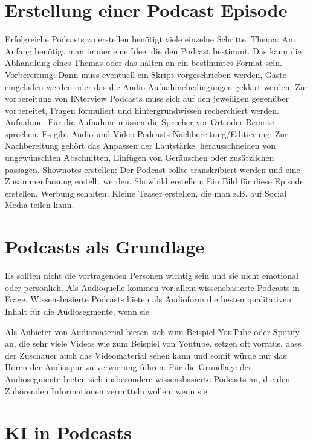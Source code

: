 \section{Erstellung einer Podcast Episode}

Erfolgreiche Podcasts zu erstellen benötigt viele einzelne Schritte.
Thema:
Am Anfang benötigt man immer eine Idee, die den Podcast bestimmt.
Das kann die Abhandlung eines Themas oder das halten an ein bestimmtes Format sein.
Vorbereitung:
Dann muss eventuell ein Skript vorgeschrieben werden, Gäste eingeladen werden oder das die Audio-Aufnahmebedingungen geklärt werden.
Zur vorbereitung von INterview Podcasts muss sich auf den jeweiligen gegenüber vorbereitet, Fragen formuliert und hintergrundwissen recherchiert werden.
Aufnahme:
Für die Aufnahme müssen die Sprecher vor Ort oder Remote sprechen.
Es gibt Audio und Video Podcasts
Nachbereitung/Editierung:
Zur Nachbereitung gehört das Anpassen der Lautstärke, herausschneiden von ungewünschten Abschnitten, Einfügen von Geräuschen oder zusätzlichen passagen.
Shownotes erstellen:
Der Podcast sollte transkribiert werden und eine Zusammenfassung erstellt werden.
Showbild erstellen:
Ein Bild für diese Episode erstellen.
Werbung schalten:
Kleine Teaser erstellen, die man z.B. auf Social Media teilen kann.

\section{Podcasts als Grundlage}

Es sollten nicht die vortragenden Personen wichtig sein und sie nicht emotional oder persönlich. 
Als Audioquelle kommen vor allem wissensbasierte Podcasts in Frage. 
Wissensbasierte Podcasts bieten als Audioform die besten qualitativen Inhalt für die Audiosegmente, wenn sie 

Als Anbieter von Audiomaterial bieten sich zum Beispiel YouTube oder Spotify an, die sehr viele 
Videos wie zum Beispiel von Youtube, setzen oft vorraus, dass der Zuschauer auch das Videomaterial sehen kann und somit würde nur das Hören der Audiospur zu verwirrung führen.
Für die Grundlage der Audiosegmente bieten sich insbesondere wissensbasierte Podcasts an, die den Zuhörenden Informationen vermitteln wollen, wenn sie 



\section{KI in Podcasts}

